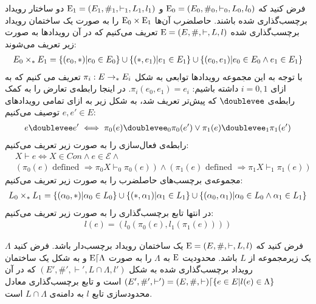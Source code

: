 \begin{definition}
    فرض کنید که
    $\mathrm{E_0} = (E_0,\#_0,\vdash_0,L_0,l_0)$
    و
    $\mathrm{E_1} = (E_1,\#_1,\vdash_1,L_1,l_1)$
    دو ساختار رویداد برچسب‌گذاری شده باشند.
    حاصلضرب آن‌ها
    $\mathrm{E}_0 \times \mathrm{E}_1$
    را به صورت یک ساختمان رویداد برچسب‌گذاری شده
    $\mathrm{E} = (E,\#,\vdash,L,l)$
    تعریف می‌کنیم که در‌ آن رویداد‌ها به صورت زیر تعریف می‌شوند:
    \begin{align*}
        E_0 \times_* E_1 =
        \{(e_0,*)|e_0 \in E_0\}
        \cup \{(*,e_1)|e_1 \in E_1\}
        \cup \{(e_0,e_1)| e_0 \in E_0 \wedge e_1 \in E_1\}
    \end{align*}
    با توجه به این مجموعه‌ رویداد‌ها توابعی به شکل
    $\pi_i: E \rightarrow_* E_i$
    تعریف می کنیم که به ازای
    $i=0,1$
    داشته باشیم:
    $\pi_i(e_0,e_1) = e_i$.
    در اینجا رابطه‌ی تعارض را به کمک رابطه‌ی
    $\doublevee$
    که پیش‌تر تعریف شد، به شکل زیر به ازای تمامی رویداد‌های
    $e,e' \in E$
    توصیف می‌کنیم:
    \begin{align*}
        e \doublevee e' \iff
        \pi_0(e)\doublevee_0 \pi_0(e')
        \vee \pi_1(e)\doublevee_1\pi_1(e')
    \end{align*}
    رابطه‌ی فعال‌سازی  را به صورت زیر تعریف می‌کنیم:
    \begin{align*}
         & X \vdash e \iff X \in Con \wedge e \in \mathcal{E} \wedge     \\
         & (\pi_0(e)\text{ defined } \Rightarrow \pi_0X\vdash_0\pi_0(e))
        \wedge (\pi_1(e)\text{ defined } \Rightarrow \pi_1X\vdash_1\pi_1(e))
    \end{align*}
    مجموعه‌ی برچسب‌های حاصلضرب را به صورت زیر تعریف می‌کنیم:
    \begin{align*}
        L_0 \times_* L_1 = \{ (\alpha_0,*)|\alpha_0 \in L_0\}
        \cup \{(*,\alpha_1)|\alpha_1 \in L_1\}
        \cup \{(\alpha_0,\alpha_1)|\alpha_0 \in L_0 \wedge \alpha_1 \in L_1\}
    \end{align*}
    در انتها تابع برچسب‌گذاری را به صورت زیر تعریف می‌کنیم:
    \begin{align*}
        l(e) = (l_0(\pi_0(e),l_1(\pi_1(e))))
    \end{align*}
\end{definition}

\begin{definition}
    فرض کنید که
    $\mathrm{E} = (E,\#,\vdash,L,l)$
    یک ساختمان رویداد برچسب‌دار باشد.
    فرض کنید
    $\Lambda$
    یک زیرمجموعه از
    $L$
    باشد.
    محدودیت
    $\mathrm{E}$
    به
    $\Lambda$
    را به صورت
    $\mathrm{E}\lceil\Lambda$
    و به شکل یک ساختمان رویداد برچسب‌گذاری شده به شکل
    $(E',\#',\vdash',L\cap\Lambda,l')$
    که در آن
    $(E',\#',\vdash') = (E,\#,\vdash)\lceil \{e \in E|l(e)\in \Lambda\}$
    است و تابع برچسب‌گذاری معادل محدودسازی تابع
    $l$
    به دامنه‌ی
    $L\cap \Lambda$
    است.
\end{definition}

